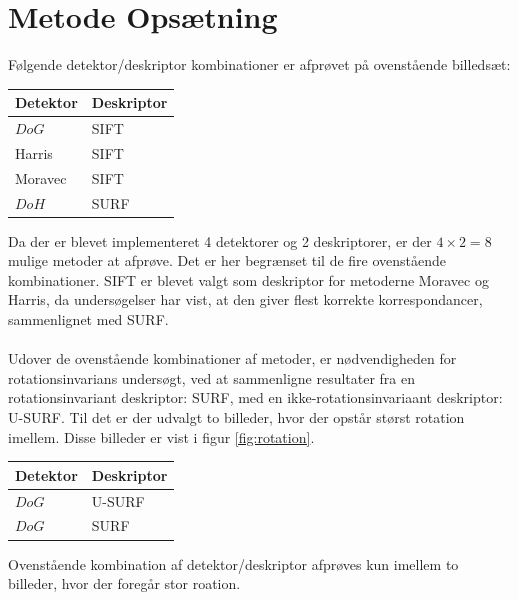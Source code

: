 \section{Metode Opsætning}
Følgende detektor/deskriptor kombinationer er afprøvet på ovenstående billedsæt:
\begin{center}
    \begin{tabular}{ | l | l |}
    \hline
    Detektor & Deskriptor \\ \hline
    $DoG$ & SIFT  \\ \hline       
    Harris & SIFT \\ \hline    
    Moravec & SIFT \\ \hline    
    $DoH$ & SURF\\ \hline    
    \end{tabular}
\end{center}
Da der er blevet implementeret 4 detektorer og 2 deskriptorer, er der $4\times 2=8$ mulige metoder at afprøve. Det er her begrænset til de fire ovenstående kombinationer. SIFT er blevet valgt som deskriptor for metoderne Moravec og Harris, da undersøgelser har vist, at den giver flest korrekte korrespondancer, sammenlignet med SURF. 
\\ \\ 
Udover de ovenstående kombinationer af metoder, er nødvendigheden for rotationsinvarians undersøgt, ved at sammenligne resultater fra en rotationsinvariant deskriptor: SURF, med en ikke-rotationsinvariaant deskriptor: U-SURF. Til det er der udvalgt to billeder, hvor der opstår størst rotation imellem. Disse billeder er vist i figur \ref{fig:rotation}.
\begin{center}
    \begin{tabular}{ | l | l |}
    \hline
    Detektor & Deskriptor \\ \hline
    $DoG$ & U-SURF \\ \hline       
    $DoG$ & SURF \\ \hline     
    \end{tabular}
\end{center}
Ovenstående kombination af detektor/deskriptor afprøves kun imellem to billeder, hvor der foregår stor roation.